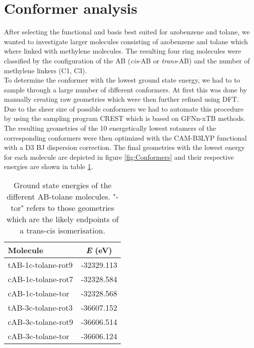 \section{Conformer analysis}
After selecting the functional and basis best suited for azobenzene and tolane, we wanted to investigate larger molecules consisting of azobenzene and tolane which where linked with methylene molecules. The resulting four ring molecules were classified by the configuration of the AB (\textit{cis}-AB or \textit{trans}-AB) and the number of methylene linkers (C1, C3). \\
To determine the conformer with the lowest ground state energy, we had to to sample through a large number of different conformers. At first this was done by manually creating raw geometries which were then further refined using DFT. Due to the sheer size of possible conformers we had to automate this procedure by using the sampling program CREST which is based on GFNn-xTB methods.\cite{crest} The resulting geometries of the 10 energetically lowest rotamers of the corresponding conformers were then optimized with the CAM-B3LYP functional with a D3 BJ dispersion correction. The final geometries with the lowest energy for each molecule are depicted in figure \ref{fig:Conformers} and their respective energies are shown in table \ref{tab:GS-energy-conformers}.
%
%
\begin{table}[h]
\caption{Ground state energies of the different AB-tolane molecules. "-tor" refers to those geometries which are the likely endpoints of a trans-cis isomerisation.}
\label{tab:GS-energy-conformers}
\centering
\vspace{0.1 cm}
\begin{tabular}{lc} 
\toprule
Molecule           & \textit{E} (\si{\eV}) \\
\midrule
tAB-1c-tolane-rot9 & -32329.113  \\
cAB-1c-tolane-rot7 & -32328.584 \\
cAB-1c-tolane-tor  & -32328.568 \\
\midrule
tAB-3c-tolane-rot3 & -36607.152 \\
cAB-3c-tolane-rot9 & -36606.514 \\
cAB-3c-tolane-tor  & -36606.124 \\
\bottomrule
\end{tabular}
\end{table}
%
%
\begin{comment}
To determine the conformer with the lowest ground state energy, we had to to sample through a large number of different conformers. To automate this procedure the program CREST was used. The resulting ten lowest rotamers of the corresponding conformers were then optimized with DFT CAM-B3LYP D3\_BJ and the resulting GS energy is listed in Table (TABLE REF).

Since we were interested in conformers with the lowest ground state energy, we initially modeled those manually and then optimised the raw structures using DFT. Due to the vast possibilities in geometries this task was automated using 
\end{comment}
